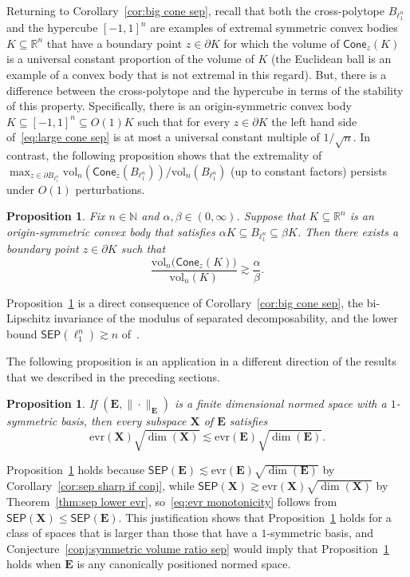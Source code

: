 \documentclass[11pt,reqno]{amsart}
\renewcommand{\le}{\leqslant}
\newcommand{\evr}{\mathrm{evr}}
\newcommand{\X}{\mathbf X}
\newcommand{\R}{\mathbb R}
\newtheorem{proposition}[theorem]{Proposition}
\theoremstyle{remark}
\renewcommand{\subset}{\subseteq}
\newcommand{\N}{\mathbb N}
\newcommand{\vol}{\mathrm{vol}}
\renewcommand{\1}{\mathbf 1}
\newcommand{\cone}{\mathsf{Cone}}
\newcommand{\sep}{\mathsf{SEP}}
\newcommand{\bfE}{\mathbf{E}}
\begin{document}
Returning to Corollary~\ref{cor:big cone sep}, recall that both the cross-polytope $B_{\ell_1^n}$ and the hypercube $[-1,1]^n$ are examples of extremal symmetric convex bodies $K\subset \R^n$ that have a boundary point $z\in \partial K$ for which the volume of  $\cone_z(K)$ is a  universal constant proportion of the volume of $K$ (the Euclidean ball is an example of a convex body that is not extremal in this regard). But,  there is a difference between  the cross-polytope and the hypercube in terms of the stability of this property. Specifically,  there is an origin-symmetric convex body $K\subset [-1,1]^n\subset O(1)K$ such that for every $z\in \partial K$ the left hand side of~\eqref{eq:large cone sep} is at most a universal constant multiple of $1/\sqrt{n}$.  In contrast, the following proposition shows that the extremality of $\max_{z\in \partial B_{\ell_1^n}} \vol_n(\cone_z(B_{\ell_1^n}))/\vol_n(B_{\ell_1^n})$ (up to constant factors)  persists under $O(1)$ perturbations.



\begin{proposition}\label{prop:stability cross polytope} Fix $n\in \N$ and $\alpha,\beta\in (0,\infty)$. Suppose that $K\subset \R^n$ is an origin-symmetric convex body that satisfies $\alpha K\subset B_{\ell_1^n}\subset \beta K$. Then there exists a boundary point $z\in \partial K$ such that
\begin{equation}\label{eq:alpha over beta}
\frac{\vol_n\big(\cone_z(K)\big)}{\vol_n(K)}\gtrsim \frac{\alpha}{\beta}.
\end{equation}
\end{proposition}
 Proposition~\ref{prop:stability cross polytope} is a direct consequence of Corollary~\ref{cor:big cone sep}, the bi-Lipschitz invariance of the modulus of separated decomposability, and the lower bound $\sep(\ell_1^n)\gtrsim n$  of~\cite{CCGGP98}.

\smallskip
The following proposition is an application in a different direction of the results that we described in the preceding sections.
\begin{proposition}\label{prop:monotonicity of evr} If $(\bfE,\|\cdot\|_\bfE)$ is a finite dimensional normed space with a $1$-symmetric basis, then every  subspace $\X$ of $\bfE$ satisfies
\begin{equation}\label{eq:evr monotonicity}
\evr(\X)\sqrt{\dim(\X)}\lesssim \evr(\bfE)\sqrt{\dim(\bfE)}.
\end{equation}
\end{proposition}
Proposition~\ref{prop:monotonicity of evr} holds because $\sep(\bfE)\lesssim \evr(\bfE)\sqrt{\dim(\bfE)}$ by Corollary~\ref{cor:sep sharp if conj}, while $\sep(\X)\gtrsim \evr(\X)\sqrt{\dim(\X)}$ by Theorem~\ref{thm:sep lower evr}, so~\eqref{eq:evr monotonicity} follows from $\sep(\X)\le \sep(\bfE)$. This justification shows that Proposition~\ref{prop:monotonicity of evr} holds for a class of spaces that is larger than those that have a $1$-symmetric basis, and Conjecture~\ref{conj:symmetric volume ratio sep} would imply that Proposition~\ref{prop:monotonicity of evr} holds when $\bfE$ is any canonically positioned normed space.
\end{document}
